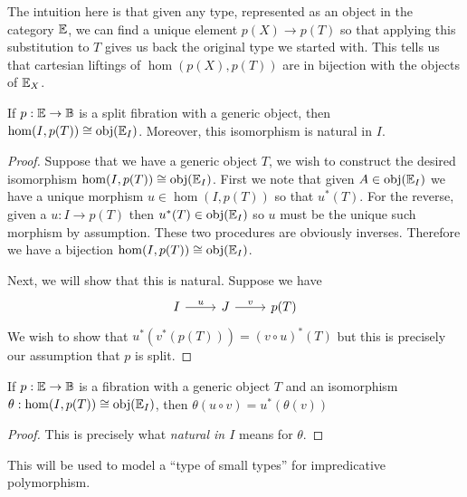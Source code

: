 The intuition here is that given any type, represented as an object in
the category $\mathbb{E}$, we can find a unique element $p(X) \to p(T)$ so
that applying this substitution to $T$ gives us back the original type
we started with. This tells us that cartesian liftings of
$\hom(p(X), p(T))$ are in bijection with the objects of
$\mathbb{E}_X$.
\begin{lem}\label{lem:fibrations:genericobject}
  If $p : \mathbb{E} \to \mathbb{B}$ is a split fibration with a generic object,
  then $\hom(I, p(T)) \cong \operatorname{obj}(\mathbb{E}_I)$. Moreover, this isomorphism
  is natural in $I$.
\end{lem}
\begin{proof}
  Suppose that we have a generic object $T$, we wish to construct the
  desired isomorphism $\hom(I, p(T)) \cong \operatorname{obj}(\mathbb{E}_I)$. First we
  note that given $A \in \operatorname{obj}(\mathbb{E}_I)$ we have a unique morphism
  $u \in \hom(I, p(T))$ so that $u^*(T)$. For the reverse, given a
  $u : I \to p(T)$ then $u^*(T) \in \operatorname{obj}(\mathbb{E}_I)$ so $u$ must be the
  unique such morphism by assumption. These two procedures are
  obviously inverses. Therefore we have a bijection
  $\hom(I, p(T)) \cong \operatorname{obj}(\mathbb{E}_I)$.

  Next, we will show that this is natural. Suppose we have
  \[
    \begin{tikzcd}
      I \ar[r, "u"] & J \ar[r, "v"] & p(T)
    \end{tikzcd}
  \]
  We wish to show that $u^*(v^*(p(T))) = (v \circ u)^*(T)$ but this is
  precisely our assumption that $p$ is split.
\end{proof}
\begin{cor}\label{cor:fibrations:reindexingcommutes}
  If $p : \mathbb{E} \to \mathbb{B}$ is a fibration with a generic object $T$
  and an isomorphism $\theta : \hom(I, p(T)) \cong \operatorname{obj}(\mathbb{E}_I)$,
  then $\theta(u \circ v) = u^*(\theta(v))$
\end{cor}
\begin{proof}
  This is precisely what \emph{natural in $I$} means for $\theta$.
\end{proof}
This will be used to model a ``type of small types'' for
impredicative polymorphism.
